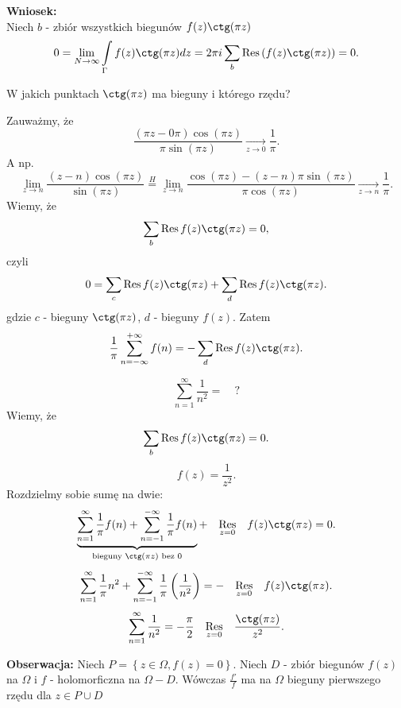 \documentclass[../main.tex]{subfiles}
\begin{document}
    \textbf{Wniosek:}\\
    Niech $b$ - zbiór wszystkich biegunów $f(z)\ctg(\pi z)$
    \[
        0 = \lim\limits_{N\to \infty} \int\limits_{\Gamma}f(z) \ctg(\pi z)dz = 2\pi i \sum_b \Res\left( f(z) \ctg(\pi z) \right) = 0
    .\]
\begin{pytanie}
    W jakich punktach $\ctg(\pi z)$ ma bieguny i którego rzędu?
\end{pytanie}
Zauważmy, że
\[
    \frac{(\pi z-0 \pi)\cos(\pi z)}{\pi\sin(\pi z)} \underset{z\to 0}{\longrightarrow} \frac{1}{\pi}
.\]
A np.
\[
    \lim\limits_{z\to n}\frac{(z-n)\cos(\pi z)}{\sin(\pi z)} \overset{H}{=} \lim\limits_{z\to n} \frac{\cos(\pi z) - (z-n)\pi \sin(\pi z)}{\pi \cos(\pi z)} \underset{z\to n}{\longrightarrow} \frac{1}{\pi}
.\]
Wiemy, że
\[
    \sum_b \Res f(z) \ctg(\pi z) = 0
,\]
czyli
\[
    0 = \sum_c \Res f(z) \ctg(\pi z) + \sum_d \Res f(z) \ctg(\pi z)
.\]
gdzie $c$ - bieguny $\ctg(\pi z)$, $d$ - bieguny $f(z)$. Zatem
\[
    \frac{1}{\pi} \sum_{n=-\infty}^{+\infty} f(n) = - \sum_d \Res f(z) \ctg(\pi z)
.\]
\begin{przyklad}
    \[
    \sum_{n=1}^{\infty} \frac{1}{n^2} = \quad ?
    \]
    Wiemy, że
    \[
        \sum_b \Res f(z) \ctg(\pi z) = 0
    .\]
\[
    f(z) = \frac{1}{z^2}
.\]
Rozdzielmy sobie sumę na dwie:
    \[
        \underbrace{\sum_{n=1}^{\infty} \frac{1}{\pi}f(n) + \sum_{n=-1}^{-\infty} \frac{1}{\pi}f(n)}_{\text{bieguny }\ctg(\pi z) \text{ bez }0} + \quad\underset{z = 0}{\Res}\quad  f(z) \ctg(\pi z) = 0
    .\]
\[
    \sum_{n=1}^{\infty} \frac{1}{\pi} n^2 + \sum_{n=-1}^{-\infty} \frac{1}{\pi}\left( \frac{1}{n^2} \right) = -\quad \underset{z=0}{\Res}\quad f(z) \ctg(\pi z)
.\]
\[
    \sum_{n=1}^{\infty} \frac{1}{n^2} = - \frac{\pi}{2} \quad\underset{z = 0}{\Res}\quad \frac{\ctg(\pi z)}{z^2}
.\]
\end{przyklad}
\textbf{Obserwacja:} Niech $P = \left\{ z\in \Omega, f(z) = 0 \right\}$. Niech $D$ - zbiór biegunów $f(z)$ na $\Omega$ i $f$ - holomorficzna na $\Omega - D$. Wówczas $\frac{f'}{f}$ ma na $\Omega$ bieguny pierwszego rzędu dla $z \in P \cup D$
\end{document}
